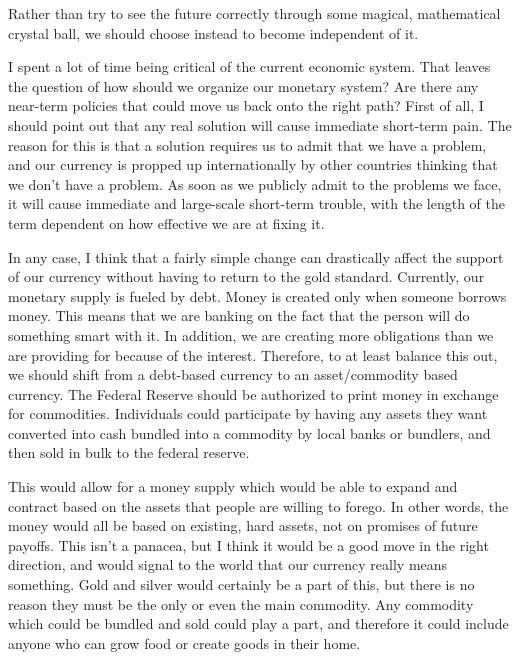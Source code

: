 Rather than try to see the future correctly through some magical,
mathematical crystal ball, we should choose instead to become
independent of it.

\begin{policynote}
I spent a lot of time being critical of the current economic system.
That leaves the question of how should we organize our monetary system?
Are there any near-term policies that could move us back onto the right path?
First of all, I should point out that any real solution will cause immediate 
short-term pain.  The reason for this is that a solution requires us to
admit that we have a problem, and our currency is propped up internationally
by other countries thinking that we don't have a problem.  As soon as we
publicly admit to the problems we face, it will cause immediate and large-scale
short-term trouble, with the length of the term dependent on how effective 
we are at fixing it.  

In any case, I think that a fairly simple change
can drastically affect the support of our currency without having to return
to the gold standard.  Currently, our monetary supply is fueled by debt.
Money is created only when someone borrows money.  This means that we
are banking on the fact that the person will do something smart with it.
In addition, we are creating more obligations than we are providing for
because of the interest.  Therefore, to at least balance this out, we
should shift from a debt-based currency to an asset/commodity based currency.
The Federal Reserve should be authorized to print money in exchange for 
commodities.  Individuals could participate by having any assets they
want converted into cash bundled into a commodity by local banks or
bundlers, and then sold in bulk to the federal reserve.  

This would allow
for a money supply which would be able to expand and contract based on 
the assets that people are willing to forego.  In other words, the money
would all be based on existing, hard assets, not on promises of future
payoffs.  This isn't a panacea, but I think it would be a good move
in the right direction, and would signal to the world that our currency
really means something.  Gold and silver would certainly be a part of this,
but there is no reason they must be the only or even the main commodity.
Any commodity which could be bundled and sold could play a part, and therefore
it could include anyone who can grow food or create goods in their home.
\end{policynote}

